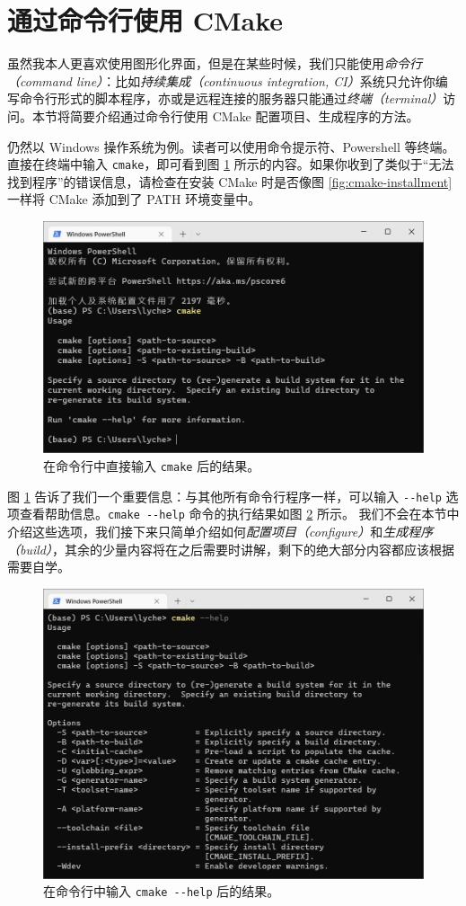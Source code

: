 
\section{通过命令行使用 CMake}

虽然我本人更喜欢使用图形化界面，但是在某些时候，我们只能使用\emph{命令行（command line）}：比如\emph{持续集成（continuous integration, CI）}系统只允许你编写命令行形式的脚本程序，亦或是远程连接的服务器只能通过\emph{终端（terminal）}访问。本节将简要介绍通过命令行使用 CMake 配置项目、生成程序的方法。

仍然以 Windows 操作系统为例。读者可以使用命令提示符、Powershell 等终端。直接在终端中输入 \lstinline[language={}]{cmake}，即可看到图 \ref{fig:cmd-1} 所示的内容。如果你收到了类似于“无法找到程序”的错误信息，请检查在安装 CMake 时是否像图 \ref{fig:cmake-installment} 一样将 CMake 添加到了 PATH 环境变量中。

\begin{figure}[H]
	\centering
	\includegraphics[width=0.8\linewidth]{assets/cmd-1}
	\caption{在命令行中直接输入 \lstinline[language={}]{cmake} 后的结果。}
	\label{fig:cmd-1}
\end{figure}

图 \ref{fig:cmd-1} 告诉了我们一个重要信息：与其他所有命令行程序一样，可以输入 \lstinline[language={}]{--help} 选项查看帮助信息。\lstinline[language={}]{cmake --help} 命令的执行结果如图 \ref{fig:cmd-2} 所示。
我们不会在本节中介绍这些选项，我们接下来只简单介绍如何\emph{配置项目（configure）}和\emph{生成程序（build）}，其余的少量内容将在之后需要时讲解，剩下的绝大部分内容都应该根据需要自学。

\begin{figure}
	\centering
	\includegraphics[width=0.8\linewidth]{assets/cmd-2}
	\caption{在命令行中输入 \lstinline[language={}]{cmake --help} 后的结果。}
	\label{fig:cmd-2}
\end{figure}
